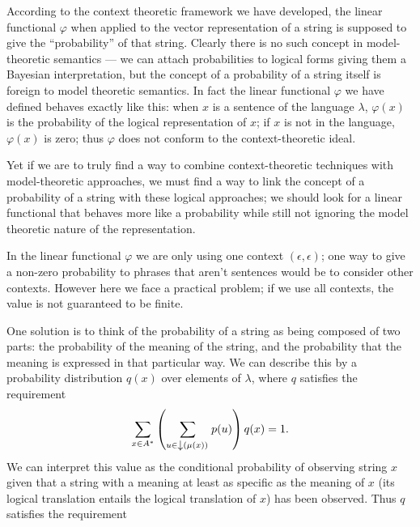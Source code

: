 According to the context theoretic framework we have developed, the linear functional $\varphi$ when applied to the vector representation of a string is supposed to give the ``probability'' of that string. Clearly there is no such concept in model-theoretic semantics --- we can attach probabilities to logical forms giving them a Bayesian interpretation, but the concept of a probability of a string itself is foreign to model theoretic semantics. In fact the linear functional $\varphi$ we have defined behaves exactly like this: when $x$ is a sentence of the language $\lambda$, $\varphi(x)$ is the probability of the logical representation of $x$; if $x$ is not in the language, $\varphi(x)$ is zero; thus $\varphi$ does not conform to the context-theoretic ideal.

Yet if we are to truly find a way to combine context-theoretic techniques with model-theoretic approaches, we must find a way to link the concept of a probability of a string with these logical approaches; we should look for a linear functional that behaves more like a probability while still not ignoring the model theoretic nature of the representation.

In the linear functional $\varphi$ we are only using one context $(\epsilon,\epsilon)$; one way to give a non-zero probability to phrases that aren't sentences would be to consider other contexts. However here we face a practical problem; if we use all contexts, the value is not guaranteed to be finite.

One solution is to think of the probability of a string as being composed of two parts: the probability of the meaning of the string, and the probability that the meaning is expressed in that particular way. We can describe this by a probability distribution $q(x)$ over elements of $\lambda$, where $q$ satisfies the requirement
$$\sum_{x\in A^*}\left(\sum_{u \in \left\downarrow(\mu(x))\right.}p(u)\right)q(x) = 1.$$
We can interpret this value as the conditional probability of observing string $x$ given that a string with a meaning at least as specific as the meaning of $x$ (its logical translation entails the logical translation of $x$) has been observed. Thus $q$ satisfies the requirement


